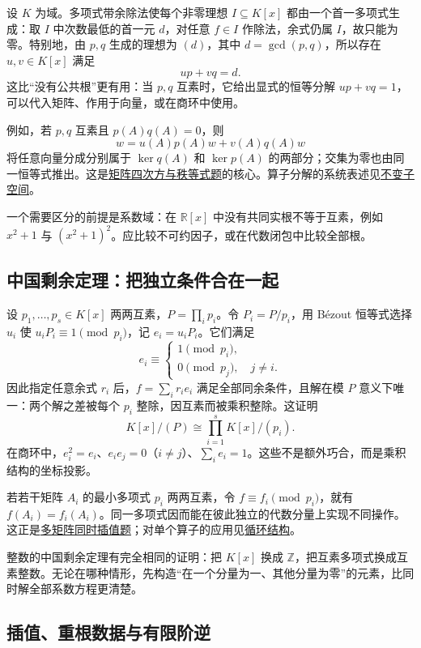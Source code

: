 \documentclass[12pt,fontset=fandol]{ctexart}
\begin{document}
\label{app:algebra-bezout}

设 $K$ 为域。多项式带余除法使每个非零理想 $I\subseteq K[x]$ 都由一个首一多项式生成：取 $I$ 中次数最低的首一元 $d$，对任意 $f\in I$ 作除法，余式仍属 $I$，故只能为零。特别地，由 $p,q$ 生成的理想为 $(d)$，其中 $d=\gcd(p,q)$，所以存在 $u,v\in K[x]$ 满足
\[
up+vq=d.
\]
这比“没有公共根”更有用：当 $p,q$ 互素时，它给出显式的恒等分解 $up+vq=1$，可以代入矩阵、作用于向量，或在商环中使用。

例如，若 $p,q$ 互素且 $p(A)q(A)=0$，则
\[
w=u(A)p(A)w+v(A)q(A)w
\]
将任意向量分成分别属于 $\ker q(A)$ 和 $\ker p(A)$ 的两部分；交集为零也由同一恒等式推出。这是\hyperref[pr:fin15-high:6]{矩阵四次方与秩等式题}的核心。算子分解的系统表述见\hyperref[app:linear-invariant]{不变子空间}。

一个需要区分的前提是系数域：在 $\mathbb R[x]$ 中没有共同实根不等于互素，例如 $x^2+1$ 与 $(x^2+1)^2$。应比较不可约因子，或在代数闭包中比较全部根。

\subsection{中国剩余定理：把独立条件合在一起}

\label{app:algebra-crt}

设 $p_1,\ldots,p_s\in K[x]$ 两两互素，$P=\prod_i p_i$。令 $P_i=P/p_i$，用 Bézout 恒等式选择 $u_i$ 使 $u_iP_i\equiv1\pmod{p_i}$，记 $e_i=u_iP_i$。它们满足
\[
e_i\equiv\begin{cases}1\pmod{p_i},\\0\pmod{p_j},\quad j\ne i.\end{cases}
\]
因此指定任意余式 $r_i$ 后，$f=\sum_i r_ie_i$ 满足全部同余条件，且解在模 $P$ 意义下唯一：两个解之差被每个 $p_i$ 整除，因互素而被乘积整除。这证明
\[
K[x]/(P)\cong\prod_{i=1}^sK[x]/(p_i).
\]
在商环中，$e_i^2=e_i$、$e_ie_j=0$（$i\ne j$）、$\sum_i e_i=1$。这些不是额外巧合，而是乘积结构的坐标投影。

若若干矩阵 $A_i$ 的最小多项式 $p_i$ 两两互素，令 $f\equiv f_i\pmod{p_i}$，就有 $f(A_i)=f_i(A_i)$。同一多项式因而能在彼此独立的代数分量上实现不同操作。这正是\hyperref[pr:ch06-14th-A-makeup2:3]{多矩阵同时插值题}；对单个算子的应用见\hyperref[app:linear-cyclic]{循环结构}。

整数的中国剩余定理有完全相同的证明：把 $K[x]$ 换成 $\mathbb Z$，把互素多项式换成互素整数。无论在哪种情形，先构造“在一个分量为一、其他分量为零”的元素，比同时解全部系数方程更清楚。

\subsection{插值、重根数据与有限阶逆}
\end{document}
